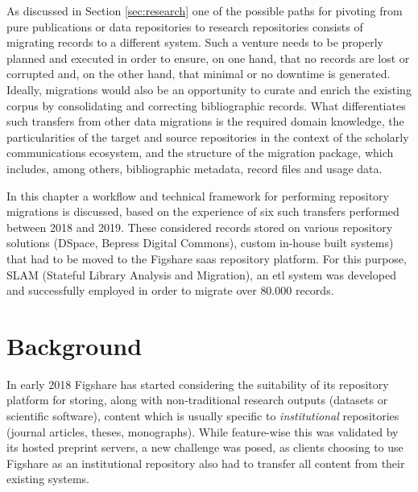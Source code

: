 As discussed in Section \ref{sec:research} one of the possible paths for pivoting from pure publications or data repositories to research repositories consists of migrating records to a different system. Such a venture needs to be properly planned and executed in order to ensure, on one hand, that no records are lost or corrupted and, on the other hand, that minimal or no downtime is generated. Ideally, migrations would also be an opportunity to curate and enrich the existing corpus by consolidating and correcting bibliographic records. What differentiates such transfers from other data migrations is the required domain knowledge, the particularities of the target and source repositories in the context of the scholarly communications ecosystem, and the structure of the migration package, which includes, among others, bibliographic metadata, record files and usage data.

In this chapter a workflow and technical framework for performing repository migrations is discussed, based on the experience of six such transfers performed between 2018 and 2019. These considered records stored on various repository solutions (DSpace, Bepress Digital Commons), custom in-house built systems) that had to be moved to the Figshare \gls{saas} repository platform. For this purpose, SLAM (Stateful  Library  Analysis  and  Migration), an \gls{etl} system was developed and successfully employed in order to migrate over $80.000$ records. 

\section{Background}
\label{sec:migbackground}

In early 2018 Figshare has started considering the suitability of its repository platform for storing, along with non-traditional research outputs (datasets or scientific software), content which is usually specific to \emph{institutional} repositories (journal articles, theses, monographs)\cite{fir}. While feature-wise this was validated by its hosted preprint servers\cite{chem}, a new challenge was posed, as clients choosing to use Figshare as an institutional repository also had to transfer all content from their existing systems.

